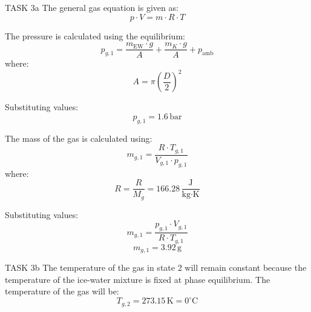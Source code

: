 TASK 3a  
The general gas equation is given as:  
\[
p \cdot V = m \cdot R \cdot T
\]  

The pressure is calculated using the equilibrium:  
\[
p_{g,1} = \frac{m_{\text{EW}} \cdot g}{A} + \frac{m_K \cdot g}{A} + p_{\text{amb}}
\]  
where:  
\[
A = \pi \left( \frac{D}{2} \right)^2
\]  

Substituting values:  
\[
p_{g,1} = 1.6 \, \text{bar}
\]  

The mass of the gas is calculated using:  
\[
m_{g,1} = \frac{R \cdot T_{g,1}}{V_{g,1} \cdot p_{g,1}}
\]  
where:  
\[
R = \frac{R}{M_g} = 166.28 \, \frac{\text{J}}{\text{kg·K}}
\]  

Substituting values:  
\[
m_{g,1} = \frac{p_{g,1} \cdot V_{g,1}}{R \cdot T_{g,1}}
\]  
\[
m_{g,1} = 3.92 \, \text{g}
\]  

TASK 3b  
The temperature of the gas in state 2 will remain constant because the temperature of the ice-water mixture is fixed at phase equilibrium. The temperature of the gas will be:  
\[
T_{g,2} = 273.15 \, \text{K} = 0^\circ\text{C}
\]
